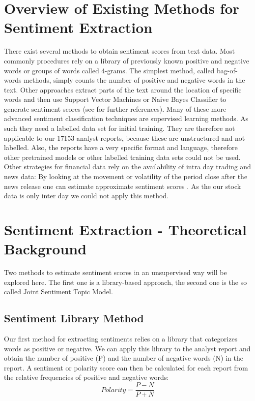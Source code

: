 \section{Overview of Existing Methods for Sentiment Extraction}
There exist several methods to obtain sentiment scores from text data. Most commonly procedures rely on a library of previously known positive and negative words or groups of words called 4-grams. The simplest method, called bag-of-words methods, simply counts the number of positive and negative words in the text. Other approaches extract parts of the text around the location of specific words and then use Support Vector Machines or Naive Bayes Classifier to generate sentiment scores (see \citet{westerski2007sentiment} for further references). Many of these more advanced sentiment classification techniques are supervised learning methods. As such they need a labelled data set for initial training. They are therefore not applicable to our 17153 analyst reports, because these are unstructured and not labelled. Also, the reports have a very specific format and language, therefore other pretrained models or other labelled training data sets could not be used. Other strategies for financial data rely on the availability of intra day trading and news data: By looking at the movement or volatility of the period close after the news release one can estimate approximate sentiment scores \citep{robertson2007news}. As the our stock data is only inter day we could not apply this method.
\\
\section{Sentiment Extraction - Theoretical Background}
Two methods to estimate sentiment scores in an unsupervised way will be explored here. The first one is a library-based approach, the second one is the so called Joint Sentiment Topic Model. 

\subsection{Sentiment Library Method}\label{BoW}
Our first method for extracting sentiments relies on a library that categorizes words as positive or negative. We can apply this library to the analyst report and obtain the number of positive (P) and the number of negative words (N) in the report. A sentiment or polarity score can then be calculated for each report from the relative frequencies of positive and negative words: 
\begin{equation}
    Polarity = \frac{P - N}{P + N} \label{eq:polarity} 
\end{equation} 

